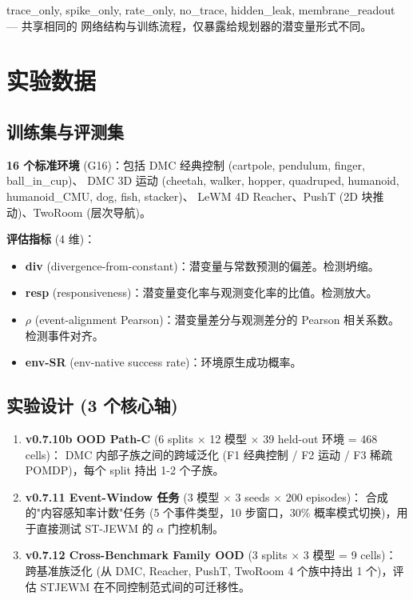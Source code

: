 \documentclass[11pt,a4paper]{article}
\begin{document}
trace\_only, spike\_only, rate\_only, no\_trace, hidden\_leak, membrane\_readout — 共享相同的
网络结构与训练流程，仅暴露给规划器的潜变量形式不同。

\section{实验数据}

\subsection{训练集与评测集}

\textbf{16 个标准环境} (G16)：包括 DMC 经典控制 (cartpole, pendulum, finger, ball\_in\_cup)、
DMC 3D 运动 (cheetah, walker, hopper, quadruped, humanoid, humanoid\_CMU, dog, fish, stacker)、
LeWM 4D Reacher、PushT (2D 块推动)、TwoRoom (层次导航)。

\textbf{评估指标} (4 维)：
\begin{itemize}
    \item \textbf{div} (divergence-from-constant)：潜变量与常数预测的偏差。检测坍缩。
    \item \textbf{resp} (responsiveness)：潜变量变化率与观测变化率的比值。检测放大。
    \item \textbf{$\rho$} (event-alignment Pearson)：潜变量差分与观测差分的 Pearson 相关系数。检测事件对齐。
    \item \textbf{env-SR} (env-native success rate)：环境原生成功概率。
\end{itemize}

\subsection{实验设计 (3 个核心轴)}

\begin{enumerate}
    \item \textbf{v0.7.10b OOD Path-C} (6 splits $\times$ 12 模型 $\times$ 39 held-out 环境 = 468 cells)：
    DMC 内部子族之间的跨域泛化 (F1 经典控制 / F2 运动 / F3 稀疏 POMDP)，每个 split 持出 1-2 个子族。
    \item \textbf{v0.7.11 Event-Window 任务} (3 模型 $\times$ 3 seeds $\times$ 200 episodes)：
    合成的"内容感知率计数"任务 (5 个事件类型，10 步窗口，30\% 概率模式切换)，用于直接测试 ST-JEWM 的 $\alpha$ 门控机制。
    \item \textbf{v0.7.12 Cross-Benchmark Family OOD} (3 splits $\times$ 3 模型 = 9 cells)：
    跨基准族泛化 (从 {DMC, Reacher, PushT, TwoRoom} 4 个族中持出 1 个)，评估 STJEWM 在不同控制范式间的可迁移性。
\end{enumerate}
\end{document}
